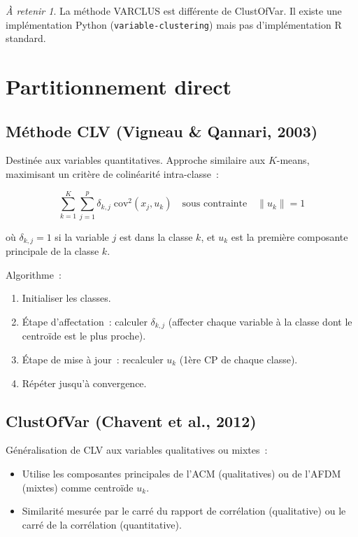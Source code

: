 \documentclass[a4paper,11pt]{article}
\theoremstyle{definition}
\theoremstyle{remark}
\newtheorem*{important}{\`A retenir}
\begin{document}
\begin{important}
  La m\'ethode VARCLUS est diff\'erente de ClustOfVar. Il existe
  une impl\'ementation Python (\texttt{variable-clustering}) mais pas
  d'impl\'ementation R standard.
\end{important}

\section{Partitionnement direct}

\subsection{M\'ethode CLV (Vigneau \& Qannari, 2003)}

Destin\'ee aux variables quantitatives. Approche similaire aux
$K$-means, maximisant un crit\`ere de colin\'earit\'e intra-classe~:

\begin{equation}
\sum_{k=1}^K \sum_{j=1}^p \delta_{k,j} \; \text{cov}^2(x_j, u_k)
\quad\text{sous contrainte}\quad \|u_k\| = 1
\end{equation}

o\`u $\delta_{k,j}=1$ si la variable $j$ est dans la classe $k$, et
$u_k$ est la premi\`ere composante principale de la classe $k$.

Algorithme~:
\begin{enumerate}
  \item Initialiser les classes.
  \item \'Etape d'affectation~: calculer $\delta_{k,j}$ (affecter
    chaque variable \`a la classe dont le centro\"ide est le plus
    proche).
  \item \'Etape de mise \`a jour~: recalculer $u_k$ (1\`ere CP de
    chaque classe).
  \item R\'ep\'eter jusqu'\`a convergence.
\end{enumerate}

\subsection{ClustOfVar (Chavent et al., 2012)}

G\'en\'eralisation de CLV aux variables qualitatives ou mixtes~:
\begin{itemize}
  \item Utilise les composantes principales de l'ACM (qualitatives)
    ou de l'AFDM (mixtes) comme centro\"ide $u_k$.
  \item Similarit\'e mesur\'ee par le carr\'e du rapport de
    corr\'elation (qualitative) ou le carr\'e de la corr\'elation
    (quantitative).
\end{itemize}
\end{document}
